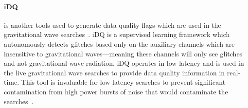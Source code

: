 \paragraph{iDQ}

is another tools used to generate data quality flags which are used in the gravitational wave searches~\cite{iDQ:2020}. iDQ is a supervised learning framework which autonomously detects glitches based only on the auxiliary channels which are insensitive to gravitational waves---meaning these channels will only see glitches and not gravitational wave radiation. iDQ operates in low-latency and is used in the live gravitational wave searches to provide data quality information in real-time. This tool is invaluable for low latency searches to prevent significant contamination from high power bursts of noise that would contaminate the searches~\cite{LIGO_data_quality:2015}.

